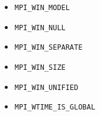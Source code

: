 \begin{multicols}{3}
\begin{itemize}
\item \texttt{MPI_WIN_MODEL}~\pageref{def:MPI_WIN_MODEL}
\item \texttt{MPI_WIN_NULL}~\pageref{def:MPI_WIN_NULL}
\item \texttt{MPI_WIN_SEPARATE}~\pageref{def:MPI_WIN_SEPARATE}
\item \texttt{MPI_WIN_SIZE}~\pageref{def:MPI_WIN_SIZE}
\item \texttt{MPI_WIN_UNIFIED}~\pageref{def:MPI_WIN_UNIFIED}
\item \texttt{MPI_WTIME_IS_GLOBAL}~\pageref{def:MPI_WTIME_IS_GLOBAL}
\end{itemize}
\end{multicols}
